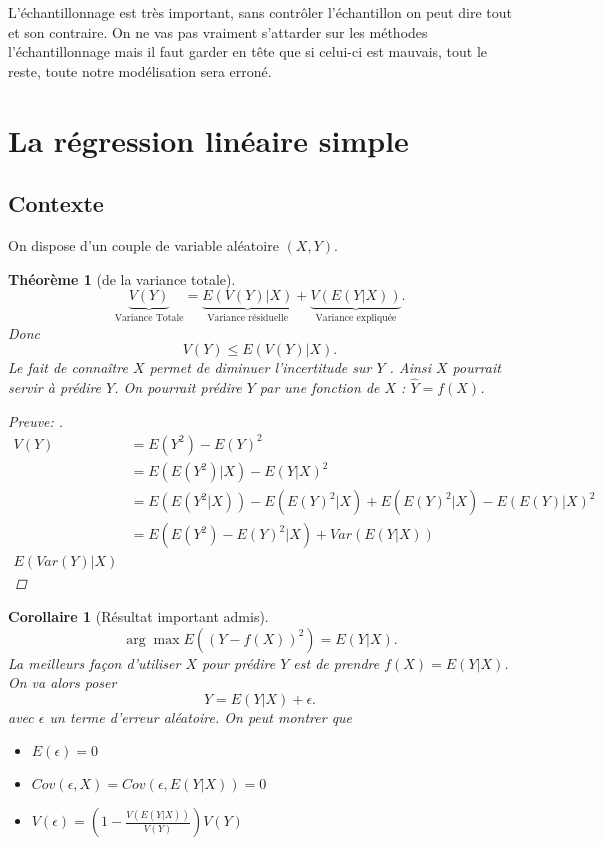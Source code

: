 \documentclass{article}
\theoremstyle{plain}%
\newtheorem{thm}{Théorème}[section]
\newtheorem*{cor}{Corollaire}
\theoremstyle{definition}
\theoremstyle{remark}
\begin{document}
L'échantillonnage est très important, sans contrôler l'échantillon on peut dire tout et son contraire. On ne vas pas vraiment s'attarder sur les méthodes l'échantillonnage mais il faut garder en tête que si celui-ci est mauvais, tout le reste, toute notre modélisation sera erroné. 

\section{La régression linéaire simple}
\subsection{Contexte}
On dispose d'un couple de variable aléatoire $ (X,Y) $.
\begin{thm}[de la variance totale]
    \[
        \underbrace{V(Y)}_{\text{Variance Totale}} = \underbrace{E(V(Y)|X)}_{\text{Variance résiduelle}} + \underbrace{V(E(Y|X))}_{\text{Variance expliquée}}
    .\]
    Donc 
    \[
        V(Y) \leq E(V(Y) | X)
    .\]
    Le fait de connaître $X$ permet de diminuer l'incertitude sur $Y$ . Ainsi $X$ pourrait servir à prédire $Y$. On pourrait prédire $Y$ par une fonction de $X$ : $ \hat{Y}= f(X) $.

    \begin{proof}[Preuve: ]
        \begin{align*}
            V(Y) &= E(Y^2) - E(Y)^2 \\
                &= E(E(Y^2)|X) - E(Y|X)^2 \\
                &= E(E(Y^2|X)) - E( E(Y)^2 | X) + E( E(Y)^2 | X) - E( E(Y)|X)^2 \\
                &= E( E(Y^2) - E(Y)^2 | X) + Var(E(Y|X)) \\
                E(Var(Y) | X)
        \end{align*}
    \end{proof}
\end{thm}

\begin{cor}[Résultat important admis]
    
    \[
        \arg \max E((Y - f(X))^2) = E(Y|X)
    .\]
    La meilleurs façon d'utiliser $ X $ pour prédire $ Y $ est de prendre $ f(X) = E(Y|X) $. On va alors poser 
    \[
        Y = E(Y|X) + \epsilon 
    .\]
    avec $ \epsilon  $ un terme d'erreur aléatoire. On peut montrer que \begin{itemize}
        \item $ E(\epsilon) = 0 $ 
        \item $ Cov(\epsilon, X) = Cov(\epsilon, E(Y|X)) = 0$ 
        \item $ V(\epsilon ) = (1- \frac{V(E(Y|X))}{V(Y)})V(Y) $ 
    \end{itemize}
\end{cor}
\end{document}
